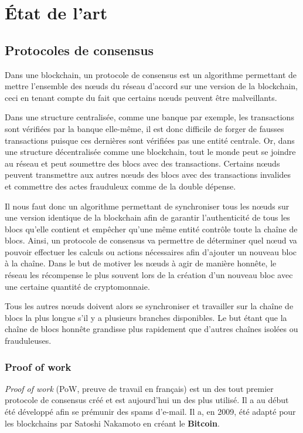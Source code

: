 \chapter{État de l'art}
\label{ch:etat_art}

\section{Protocoles de consensus}

Dans une blockchain, un protocole de consensus est un algorithme permettant de mettre l'ensemble des nœuds du réseau d'accord sur une version de la blockchain, ceci en tenant compte du fait que certains nœuds peuvent être malveillants.

Dans une structure centralisée, comme une banque par exemple, les transactions sont vérifiées par la banque elle-même, il est donc difficile de forger de fausses transactions puisque ces dernières sont vérifiées pas une entité centrale. Or, dans une structure décentralisée comme une blockchain, tout le monde peut se joindre au réseau et peut soumettre des blocs avec des transactions. Certains nœuds peuvent transmettre aux autres nœuds des blocs avec des transactions invalides et commettre des actes frauduleux comme de la double dépense.

Il nous faut donc un algorithme permettant de synchroniser tous les nœuds sur une version identique de la blockchain afin de garantir l'authenticité de tous les blocs qu'elle contient et empêcher qu'une même entité contrôle toute la chaîne de blocs. Ainsi, un protocole de consensus va permettre de déterminer quel nœud va pouvoir effectuer les calculs ou actions nécessaires afin d'ajouter un nouveau bloc à la chaîne. Dans le but de motiver les nœuds à agir de manière honnête, le réseau les récompense le plus souvent lors de la création d'un nouveau bloc avec une certaine quantité de cryptomonnaie. 

Tous les autres nœuds doivent alors se synchroniser et travailler sur la chaîne de blocs la plus longue s'il y a plusieurs branches disponibles. Le but étant que la chaîne de blocs honnête grandisse plus rapidement que d'autres chaînes isolées ou frauduleuses.

\newpage

\subsection{Proof of work}
\label{consensus:pow}

\textit{Proof of work} (PoW, preuve de travail en français) est un des tout premier protocole de consensus créé et est aujourd'hui un des plus utilisé. Il a au début été développé afin se prémunir des spams d'e-mail. Il a, en 2009, été adapté pour les blockchains par Satoshi Nakamoto en créant le \textbf{Bitcoin}.

